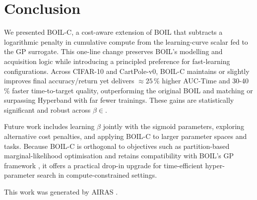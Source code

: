 \documentclass{article} %
\begin{document}
\section{Conclusion}
\label{sec:conclusion}
We presented BOIL-C, a cost-aware extension of BOIL that subtracts a logarithmic penalty in cumulative compute from the learning-curve scalar fed to the GP surrogate. This one-line change preserves BOIL's modelling and acquisition logic while introducing a principled preference for fast-learning configurations. Across CIFAR-10 and CartPole-v0, BOIL-C maintains or slightly improves final accuracy/return yet delivers \(\approx 25\,\%\) higher AUC-Time and 30-40\,\% faster time-to-target quality, outperforming the original BOIL and matching or surpassing Hyperband with far fewer trainings. These gains are statistically significant and robust across \(\beta\in\).

Future work includes learning \(\beta\) jointly with the sigmoid parameters, exploring alternative cost penalties, and applying BOIL-C to larger parameter spaces and tasks. Because BOIL-C is orthogonal to objectives such as partition-based marginal-likelihood optimisation \cite{mlodozeniec-2023-hyperparameter} and retains compatibility with BOIL's GP framework \cite{nguyen-2019-bayesian}, it offers a practical drop-in upgrade for time-efficient hyper-parameter search in compute-constrained settings.

This work was generated by \textsc{AIRAS} \citep{airas2025}.



\end{document}
